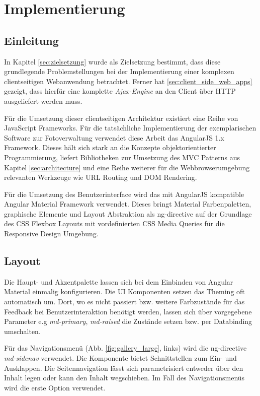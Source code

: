 \chapter{Implementierung}

\section{Einleitung}

In Kapitel \ref{sec:zielsetzung} wurde als Zielsetzung bestimmt, dass diese grundlegende Problemstellungen bei der Implementierung einer komplexen clientseitigen Webanwendung betrachtet. Ferner hat \ref{sec:client_side_web_apps} gezeigt, dass hierfür eine komplette \textit{Ajax-Engine} an den Client über HTTP ausgeliefert werden muss.

Für die Umsetzung dieser clientseitigen Architektur existiert eine Reihe von JavaScript Frameworks. Für die tatsächliche Implementierung der exemplarischen Software zur Fotoverwaltung verwendet diese Arbeit das AngularJS 1.x Framework. Dieses hält sich stark an die Konzepte objektorientierter Programmierung, liefert Bibliotheken zur Umsetzung des MVC Patterns aus Kapitel \ref{sec:architecture} und eine Reihe weiterer für die Webbrowserumgebung relevanten Werkzeuge wie URL Routing und DOM Rendering.

Für die Umsetzung des Benutzerinterface wird das mit AngularJS kompatible Angular Material Framework verwendet. Dieses bringt Material Farbenpaletten, graphische Elemente und Layout Abstraktion als \gls{ng-directive} auf der Grundlage des CSS Flexbox Layouts mit vordefinierten CSS Media Queries für die Responsive Design Umgebung.

\section{Layout}

Die Haupt- und Akzentpalette lassen sich bei dem Einbinden von Angular Material einmalig konfigurieren. Die UI Komponenten setzen das Theming oft automatisch um.
Dort, wo es nicht passiert bzw. weitere Farbzustände für das Feedback bei Benutzerinteraktion benötigt werden, lassen sich über vorgegebene Parameter e.g \textit{md-primary}, \textit{md-raised} die Zustände setzen bzw. per Databinding umschalten.

Für das Navigationsmenü (Abb. \ref{fig:gallery_large}, links) wird die \gls{ng-directive} \textit{md-sidenav} verwendet. Die Komponente bietet Schnittstellen zum Ein- und Ausklappen. Die Seitennavigation lässt sich parametrisiert entweder über den Inhalt legen oder kann den Inhalt wegschieben. Im Fall des Navigationsmenüs wird die erste Option verwendet.

